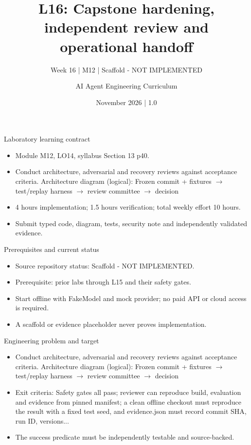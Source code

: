 \documentclass[aspectratio=169,10pt]{beamer}
\title[L16 - Agent Engineering]{L16: Capstone hardening, independent review and operational handoff}
\subtitle{Week 16 | M12 | Scaffold - NOT IMPLEMENTED}
\author{AI Agent Engineering Curriculum}
\date{November 2026 | 1.0}
\begin{document}
\begin{frame}\titlepage\end{frame}

\begin{frame}{Laboratory learning contract}
\small
\begin{itemize}
\item Module M12, LO14, syllabus Section 13 p40.
\item Conduct architecture, adversarial and recovery reviews against acceptance criteria. Architecture diagram (logical): Frozen commit + fixtures $\rightarrow$ test/replay harness $\rightarrow$ review committee $\rightarrow$ decision
\item 4 hours implementation; 1.5 hours verification; total weekly effort 10 hours.
\item Submit typed code, diagram, tests, security note and independently validated evidence.
\end{itemize}

\end{frame}

\begin{frame}{Prerequisites and current status}
\small
\begin{itemize}
\item Source repository status: Scaffold - NOT IMPLEMENTED.
\item Prerequisite: prior labs through L15 and their safety gates.
\item Start offline with FakeModel and mock provider; no paid API or cloud access is required.
\item A scaffold or evidence placeholder never proves implementation.
\end{itemize}

\end{frame}

\begin{frame}{Engineering problem and target}
\small
\begin{itemize}
\item Conduct architecture, adversarial and recovery reviews against acceptance criteria. Architecture diagram (logical): Frozen commit + fixtures $\rightarrow$ test/replay harness $\rightarrow$ review committee $\rightarrow$ decision
\item Exit criteria: Safety gates all pass; reviewer can reproduce build, evaluation and evidence from pinned manifest; a clean offline checkout must reproduce the result with a fixed test seed, and evidence.json must record commit SHA, run ID, versions...
\item The success predicate must be independently testable and source-backed.
\end{itemize}

\end{frame}
\end{document}
